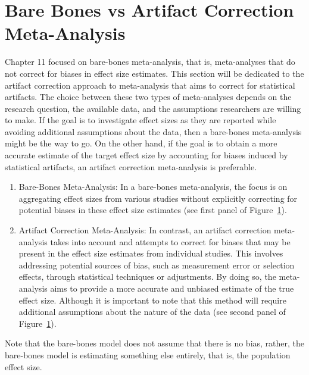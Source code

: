 \documentclass[
  letterpaper,
  DIV=11,
  numbers=noendperiod]{scrreprt}
\begin{document}
\section{Bare Bones vs Artifact Correction
Meta-Analysis}\label{bare-bones-vs-artifact-correction-meta-analysis}

Chapter 11 focused on bare-bones meta-analysis, that is, meta-analyses
that do not correct for biases in effect size estimates. This section
will be dedicated to the artifact correction approach to meta-analysis
that aims to correct for statistical artifacts. The choice between these
two types of meta-analyses depends on the research question, the
available data, and the assumptions researchers are willing to make. If
the goal is to investigate effect sizes as they are reported while
avoiding additional assumptions about the data, then a bare-bones
meta-analysis might be the way to go. On the other hand, if the goal is
to obtain a more accurate estimate of the target effect size by
accounting for biases induced by statistical artifacts, an artifact
correction meta-analysis is preferable.

\begin{enumerate}
\def\labelenumi{\arabic{enumi}.}
\item
  Bare-Bones Meta-Analysis: In a bare-bones meta-analysis, the focus is
  on aggregating effect sizes from various studies without explicitly
  correcting for potential biases in these effect size estimates (see
  first panel of Figure~\ref{fig-art-corr-mdl}).
\item
  Artifact Correction Meta-Analysis: In contrast, an artifact correction
  meta-analysis takes into account and attempts to correct for biases
  that may be present in the effect size estimates from individual
  studies. This involves addressing potential sources of bias, such as
  measurement error or selection effects, through statistical techniques
  or adjustments. By doing so, the meta-analysis aims to provide a more
  accurate and unbiased estimate of the true effect size. Although it is
  important to note that this method will require additional assumptions
  about the nature of the data (see second panel of
  Figure~\ref{fig-art-corr-mdl}).
\end{enumerate}

Note that the bare-bones model does not assume that there is no bias,
rather, the bare-bones model is estimating something else entirely, that
is, the population effect size.

\begin{figure}[H]


\caption{\label{fig-art-corr-mdl}}

\end{figure}%
\end{document}
